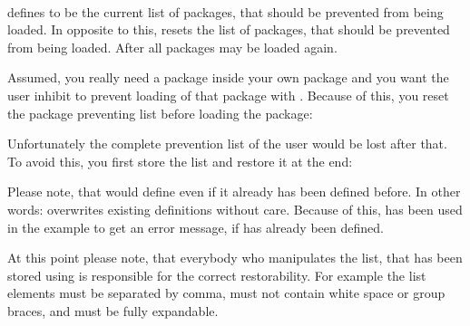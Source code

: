 \begin{Declaration}
  \\
\end{Declaration}
%
%
defines  to be the current list of packages, that should be
prevented from being loaded. In opposite to this,
resets the list of packages, that should be prevented from being loaded. After
 all packages may be loaded again.
\begin{Example}
  Assumed, you really need a package inside your own package and you want the
  user inhibit to prevent loading of that package with
  . Because
  of this, you reset the package preventing list before loading the package:
\begin{lstcode}
  \ResetPreventPackageFromLoading
  \RequirePackage{foo}
\end{lstcode}
  Unfortunately the complete prevention list of the user would be lost after
  that. To avoid this, you first store the list and restore it at the end:
\begin{lstcode}
  \newcommand*{\Users@PreventList}{}%
  \StorePreventPackageFromLoading\Users@PreventList
  \ResetPreventPackageFromLoading
  \RequirePackage{foo}
  \PreventPackageFromLoading{\Users@PreventList}
\end{lstcode}
  Please note, that
   would define
   even if it already has been defined before. In other
  words:  overwrites existing
   definitions without care. Because of this,
   has been used in the example to get an error message, if
   has already been defined.
\end{Example}
At this point please note, that everybody who manipulates the list, that has
been stored using  is responsible for
the correct restorability. For example the list elements must be separated by
comma, must not contain white space or group braces, and must be fully
expandable.

